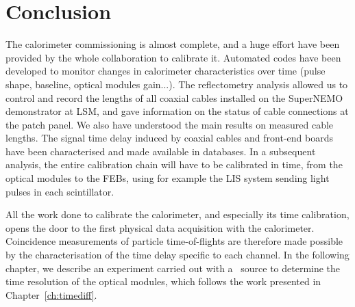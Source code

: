 \section{Conclusion}

The calorimeter commissioning is almost complete, and a huge effort have been provided by the whole collaboration to calibrate it.
Automated codes have been developed to monitor changes in calorimeter characteristics over time (pulse shape, baseline, optical modules gain...).
The reflectometry analysis allowed us to control and record the lengths of all coaxial cables installed on the SuperNEMO demonstrator at LSM, and gave information on the status of cable connections at the patch panel.
We also have understood the main results on measured cable lengths.
The signal time delay induced by coaxial cables and front-end boards have been characterised and made available in databases.
In a subsequent analysis, the entire calibration chain will have to be calibrated in time, from the optical modules to the FEBs, using for example the LIS system sending light pulses in each scintillator.

All the work done to calibrate the calorimeter, and especially its time calibration, opens the door to the first physical data acquisition with the calorimeter.
Coincidence measurements of particle time-of-flights are therefore made possible by the characterisation of the time delay specific to each channel.
In the following chapter, we describe an experiment carried out with a \Co\ source to determine the time resolution of the optical modules, which follows the work presented in Chapter~\ref{ch:timediff}.

